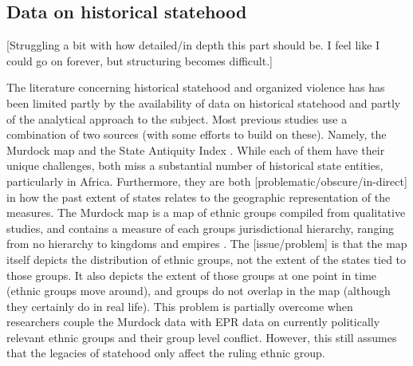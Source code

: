 
\subsection{Data on historical statehood} \label{Data on historical statehood}






[Struggling a bit with how detailed/in depth this part should be. I feel like I
could go on forever, but structuring becomes difficult.]

The literature concerning historical statehood and organized violence has has
been limited partly by the availability of data on historical statehood and
partly of the analytical approach to the subject. Most previous studies use a
combination of two sources (with some efforts to build on these). Namely, the
Murdock map \citep{Murdock1967} and the State Antiquity Index
\citep{Bockstette2012}. While each of them have their unique challenges, both
miss a substantial number of historical state entities, particularly in Africa.
Furthermore, they are both [problematic/obscure/in-direct] in how the past
extent of states relates to the geographic representation of the measures. The
Murdock map is a map of ethnic groups compiled from qualitative studies, and
contains a measure of each groups jurisdictional hierarchy, ranging from no
hierarchy to kingdoms and empires \citep{Murdock1967}. The [issue/problem] is
that the map itself depicts the distribution of ethnic groups, not the extent of
the states tied to those groups. It also depicts the extent of those groups at
one point in time (ethnic groups move around), and groups do not overlap in the
map (although they certainly do in real life). This problem is partially
overcome when researchers couple the Murdock data with EPR data on currently
politically relevant ethnic groups and their group level conflict. However, this
still assumes that the legacies of statehood only affect the ruling ethnic
group.

